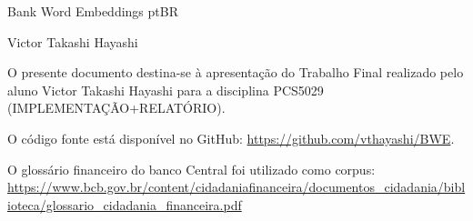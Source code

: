 \documentclass[a4paper,11pt,oneside,onecolumn,final]{article}
\begin{document}
\setlength{\parindent}{0pt} %

   
\Huge Bank Word Embeddings ptBR

\vspace{10mm} %



\Large Victor Takashi Hayashi
\vspace{5mm} %

\renewcommand{\baselinestretch}{1.15} %
\normalsize

O presente documento destina-se à apresentação do Trabalho Final realizado pelo aluno Victor Takashi Hayashi para a disciplina PCS5029 (IMPLEMENTAÇÃO+RELATÓRIO).

O código fonte está disponível no GitHub: \url{https://github.com/vthayashi/BWE}.

O glossário financeiro do banco Central foi utilizado como corpus:  \url{https://www.bcb.gov.br/content/cidadaniafinanceira/documentos_cidadania/biblioteca/glossario_cidadania_financeira.pdf}

\vspace{5mm}
\end{document}
